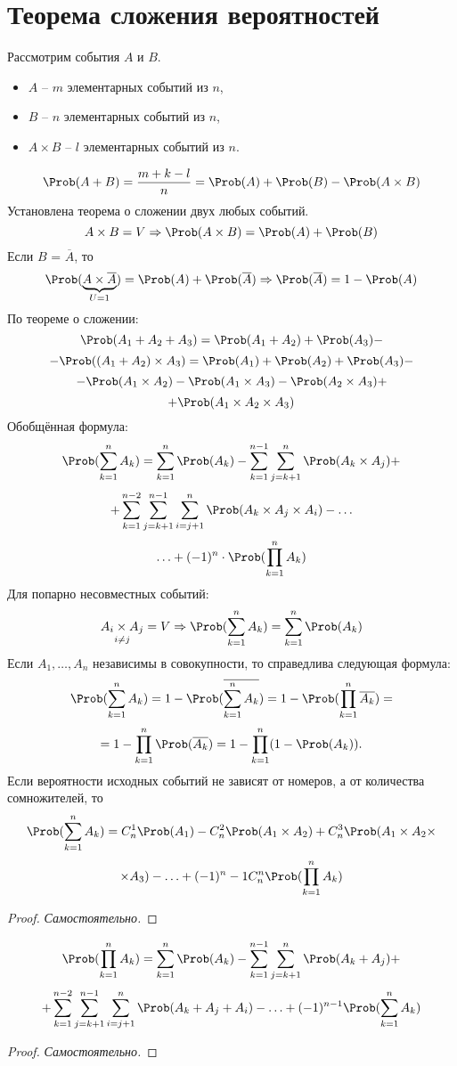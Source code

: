 \section{Теорема сложения вероятностей}
Рассмотрим события $A$ и $B$.
\begin{itemize}
	\item $A$ -- $m$ элементарных событий из $n$,
	\item $B$ -- $n$ элементарных событий из $n$,
	\item $A \times B$ -- $l$ элементарных событий из $n$.
\end{itemize}
\[
	\Prob(A + B) = \frac{m + k - l}{n} = \Prob(A) + \Prob(B) - \Prob(A \times B)
\]
Установлена теорема о сложении двух любых событий.
\[
	A \times B = V \Rightarrow \Prob(A \times B) = \Prob(A) + \Prob(B)
\]
Если $B$ = $\overline{A}$, то
\[
	\Prob(\underbrace{A \times \overline{A}}_{U = 1}) = \Prob(A) + \Prob(\overline{A}) \Rightarrow \Prob(\overline{A}) = 1 - \Prob(A)
\]
По теореме о сложении:
\[ \Prob(A_1 + A_2 + A_3) = \Prob(A_1 + A_2) + \Prob(A_3) -  \]
\[ - \Prob((A_1 + A_2) \times A_3) = \Prob(A_1) + \Prob(A_2) + \Prob(A_3) - \]	
\[ - \Prob(A_1 \times A_2) - \Prob(A_1 \times A_3) - \Prob(A_2 \times A_3) + \]
\[ + \Prob(A_1 \times A_2 \times A_3) \]
Обобщённая формула:
\[ \Prob(\sum\limits_{k=1}^n A_k) = \sum\limits_{k=1}^n \Prob(A_k) - \sum\limits_{k=1}^{n-1} \sum\limits_{j=k+1}^n \Prob(A_k \times A_j) + \]
\[
	+ \sum\limits_{k=1}^{n-2} \sum\limits_{j=k+1}^{n-1} \sum\limits_{i=j+1}^n \Prob(A_k \times A_j \times A_i) - \ldots 
\]
\[
	\ldots + (-1)^n \cdot \Prob(\prod\limits_{k=1}^n A_k)
\]
Для попарно несовместных событий:
\[
	\underset{i \not= j}{A_i \times A_j} = V \Rightarrow \Prob(\sum\limits_{k=1}^n A_k) = \sum\limits_{k=1}^n \Prob(A_k)
\]
Если $A_1, \dots, A_n$ независимы в совокупности, то справедлива следующая формула:
\[
	\Prob(\sum\limits_{k=1}^n A_k) = 1 - \Prob(\overline{\sum\limits_{k=1}^n A_k}) = 1 - \Prob(\prod\limits_{k=1}^n \overline{A_k}) =
\]
\[ = 1 - \prod\limits_{k=1}^n \Prob(\overline{A_k}) = 1 - \prod\limits_{k=1}^n(1 - \Prob(A_k)). \]
Если вероятности исходных событий не зависят от номеров, а от количества сомножителей, то
\[ \Prob(\sum\limits_{k=1}^n A_k) = C_n^1 \Prob(A_1) - C_n^2 \Prob(A_1 \times A_2) + C_n^3 \Prob(A_1 \times A_2 \times \]
\[ \times A_3) - \ldots + (-1)^n-1 C_n^n \Prob(\prod\limits_{k=1}^n A_k) \]
\begin{proof}
	\textit{Самостоятельно.}
\end{proof}
\[ \Prob(\prod\limits_{k=1}^n A_k) = \sum\limits_{k=1}^n \Prob(A_k) - \sum\limits_{k=1}^{n-1} \sum\limits_{j=k+1}^{n} \Prob(A_k + A_j) + \]
\[ + \sum\limits_{k=1}^{n-2} \sum\limits_{j=k+1}^{n-1} \sum\limits_{i=j+1}^{n} \Prob(A_k + A_j + A_i) - \ldots + (-1)^{n-1} \Prob(\sum\limits_{k=1}^n A_k) \]
\begin{proof}
	\textit{Самостоятельно.}
\end{proof}
